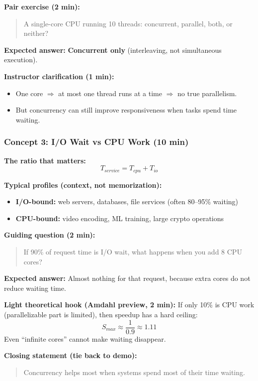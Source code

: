 \documentclass[11pt,a4paper]{article}
\begin{document}
\textbf{Pair exercise (2 min):}
\begin{quote}
	A single-core CPU running 10 threads: concurrent, parallel, both, or neither?
\end{quote}

\textbf{Expected answer:} \textbf{Concurrent only} (interleaving, not simultaneous execution).

\textbf{Instructor clarification (1 min):}
\begin{itemize}[leftmargin=*]
	\item One core $\Rightarrow$ at most one thread runs at a time $\Rightarrow$ no true parallelism.
	\item But concurrency can still improve responsiveness when tasks spend time waiting.
\end{itemize}

\subsubsection*{Concept 3: I/O Wait vs CPU Work (10 min)}

\textbf{The ratio that matters:}
\[
T_{service} = T_{cpu} + T_{io}
\]

\textbf{Typical profiles (context, not memorization):}
\begin{itemize}[leftmargin=*]
	\item \textbf{I/O-bound:} web servers, databases, file services (often 80--95\% waiting)
	\item \textbf{CPU-bound:} video encoding, ML training, large crypto operations
\end{itemize}

\textbf{Guiding question (2 min):}
\begin{quote}
	If 90\% of request time is I/O wait, what happens when you add 8 CPU cores?
\end{quote}

\textbf{Expected answer:}
Almost nothing for that request, because extra cores do not reduce waiting time.

\textbf{Light theoretical hook (Amdahl preview, 2 min):}
If only 10\% is CPU work (parallelizable part is limited), then speedup has a hard ceiling:
\[
S_{max} \approx \frac{1}{0.9} \approx 1.11
\]
Even ``infinite cores'' cannot make waiting disappear.

\textbf{Closing statement (tie back to demo):}
\begin{quote}
	Concurrency helps most when systems spend most of their time waiting.
\end{quote}
\end{document}
